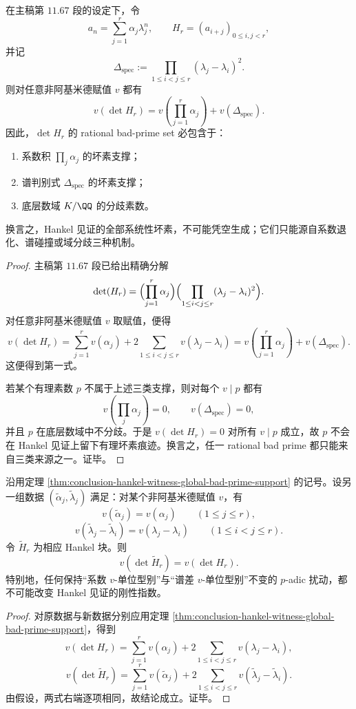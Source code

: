 \begin{theorem}\label{thm:conclusion-hankel-witness-global-bad-prime-support}
在主稿第 \(11.67\) 段的设定下，令
\[
a_n=\sum_{j=1}^r \alpha_j \lambda_j^n,
\qquad
H_r=(a_{i+j})_{0\le i,j<r},
\]
并记
\[
\Delta_{\mathrm{spec}}:=\prod_{1\le i<j\le r}(\lambda_j-\lambda_i)^2.
\]
则对任意非阿基米德赋值 \(v\) 都有
\[
v(\det H_r)=v\!\left(\prod_{j=1}^r\alpha_j\right)+v(\Delta_{\mathrm{spec}}).
\]
因此，\(\det H_r\) 的 rational bad-prime set 必包含于：
\begin{enumerate}
  \item 系数积 \(\prod_j\alpha_j\) 的坏素支撑；
  \item 谱判别式 \(\Delta_{\mathrm{spec}}\) 的坏素支撑；
  \item 底层数域 \(K/\QQ\) 的分歧素数。
\end{enumerate}
换言之，Hankel 见证的全部系统性坏素，不可能凭空生成；它们只能源自系数退化、谱碰撞或域分歧三种机制。
\end{theorem}
\begin{proof}
主稿第 \(11.67\) 段已给出精确分解
\[
\det(H_r)
=
\Bigl(\prod_{j=1}^r\alpha_j\Bigr)
\Bigl(\prod_{1\le i<j\le r}(\lambda_j-\lambda_i)^2\Bigr).
\]
对任意非阿基米德赋值 \(v\) 取赋值，便得
\[
v(\det H_r)
=
\sum_{j=1}^r v(\alpha_j)+2\sum_{1\le i<j\le r}v(\lambda_j-\lambda_i)
=
v\!\left(\prod_{j=1}^r\alpha_j\right)+v(\Delta_{\mathrm{spec}}).
\]
这便得到第一式。

若某个有理素数 \(p\) 不属于上述三类支撑，则对每个 \(v\mid p\) 都有
\[
v\!\left(\prod_j\alpha_j\right)=0,
\qquad
v(\Delta_{\mathrm{spec}})=0,
\]
并且 \(p\) 在底层数域中不分歧。于是 \(v(\det H_r)=0\) 对所有 \(v\mid p\) 成立，故 \(p\) 不会在 Hankel 见证上留下有理坏素痕迹。换言之，任一 rational bad prime 都只能来自三类来源之一。证毕。
\end{proof}

\begin{corollary}\label{cor:conclusion-hankel-witness-padic-unit-perturbation-rigidity}
沿用定理 \ref{thm:conclusion-hankel-witness-global-bad-prime-support} 的记号。设另一组数据 \((\widetilde\alpha_j,\widetilde\lambda_j)\) 满足：对某个非阿基米德赋值 \(v\)，有
\[
v(\widetilde\alpha_j)=v(\alpha_j)
\qquad (1\le j\le r),
\]
\[
v(\widetilde\lambda_j-\widetilde\lambda_i)=v(\lambda_j-\lambda_i)
\qquad (1\le i<j\le r).
\]
令 \(\widetilde H_r\) 为相应 Hankel 块。则
\[
v(\det \widetilde H_r)=v(\det H_r).
\]
特别地，任何保持“系数 \(v\)-单位型别”与“谱差 \(v\)-单位型别”不变的 \(p\)-adic 扰动，都不可能改变 Hankel 见证的刚性指数。
\end{corollary}
\begin{proof}
对原数据与新数据分别应用定理 \ref{thm:conclusion-hankel-witness-global-bad-prime-support}，得到
\[
v(\det H_r)=\sum_{j=1}^r v(\alpha_j)+2\sum_{1\le i<j\le r}v(\lambda_j-\lambda_i),
\]
\[
v(\det \widetilde H_r)=\sum_{j=1}^r v(\widetilde\alpha_j)+2\sum_{1\le i<j\le r}v(\widetilde\lambda_j-\widetilde\lambda_i).
\]
由假设，两式右端逐项相同，故结论成立。证毕。
\end{proof}

